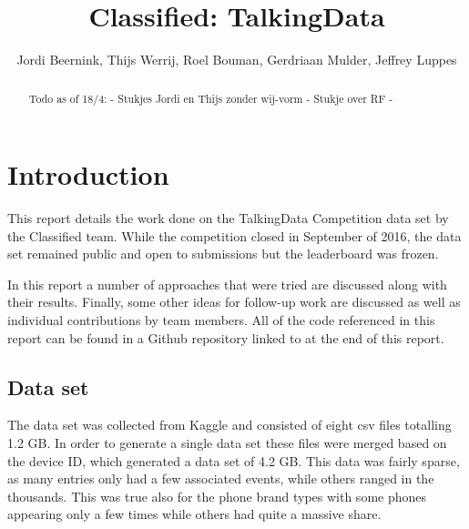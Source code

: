 \documentclass[runningheads,a4paper]{llncs}
\begin{document}
\mainmatter 

\title{Classified: TalkingData}


\author{Jordi Beernink, Thijs Werrij, Roel Bouman, Gerdriaan Mulder, Jeffrey Luppes}



\tocauthor{{}}

\maketitle

\begin{abstract}
Todo as of 18/4: 
- Stukjes Jordi en Thijs zonder wij-vorm
- Stukje over RF
-
\end{abstract}

\medskip

\begingroup
\let\clearpage\relax
\tableofcontents
{}
\endgroup

\medskip
\medskip

\section{Introduction}
This report details the work done on the TalkingData Competition data set by the Classified team. While the competition closed in September of 2016,  the data set remained public and open to submissions but the leaderboard was frozen.

In this report a number of approaches that were tried are discussed along with their results. Finally, some other ideas for follow-up work are discussed as well as individual contributions by team members. All of the code referenced in this report can be found in a Github repository linked to at the end of this report. 

\subsection{Data set}
The data set was collected from Kaggle and consisted of eight csv files totalling 1.2 GB. In order to generate a single data set these files were merged based on the device ID, which generated a data set of 4.2 GB. This data was fairly sparse, as many entries only had a few associated events, while others ranged in the thousands. This was true also for the phone brand types with some phones appearing only a few times while others had quite a massive share. 
\medskip
\end{document}
